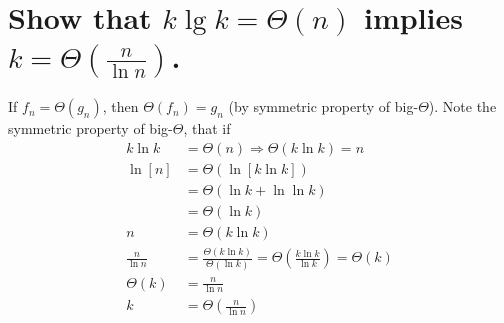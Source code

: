 \section[Problem 3]{Show that $k \lg k = \Theta(n)$ implies $k = \Theta\left(\frac{n}{\ln n}\right)$.}
If $f_n = \Theta(g_n)$, then $\Theta(f_n) = g_n$ (by symmetric property of big-$\Theta$).
Note the symmetric property of big-$\Theta$, that if 
\begin{align*}
	k \ln k &= \Theta(n) \Longrightarrow \Theta(k \ln k) = n \\
	\ln [n] &= \Theta ( \ln [k \ln k ] ) \\
	&=
	\Theta (\ln k + \ln \ln k) \\
	&= \Theta(\ln k) \\
	n &= \Theta(k \ln k) \\
	\frac{n}{\ln n} &= \frac{\Theta(k \ln k)}{\Theta(\ln k)} = \Theta \left( \frac{k \ln k}{\ln k} \right) = \Theta(k) \\
	\Theta(k) &= \frac{n}{\ln n} \\ 
	k &= \Theta \left( \frac{n}{\ln n} \right) 
\end{align*}

